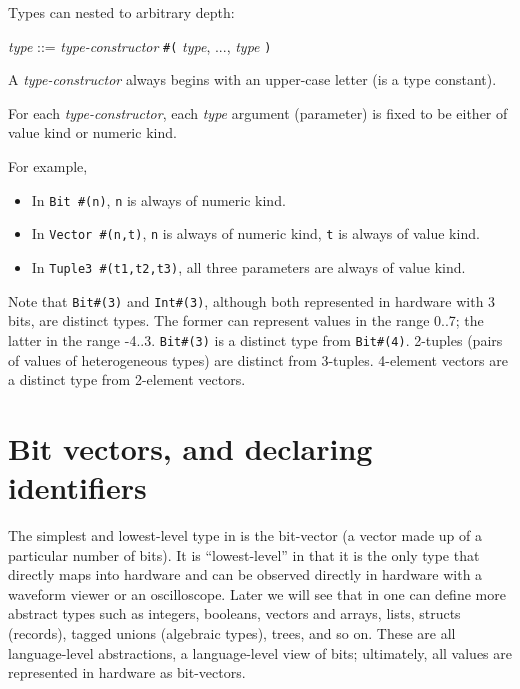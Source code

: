 Types can nested to arbitrary depth:

\begin{tabbing}
 \hmmmm \emph{type} ::= \emph{type-constructor} {\tt \#(} \emph{type}, ..., \emph{type} {\tt )}
\end{tabbing}

A \emph{type-constructor} always begins with an upper-case letter (is a type constant).

For each \emph{type-constructor}, each \emph{type} argument
(parameter) is fixed to be either of value kind or numeric kind.

For example,

\begin{itemize}

 \item In \verb|Bit #(n)|, \verb|n| is always of numeric kind.

 \item In \verb|Vector #(n,t)|, \verb|n| is always of numeric kind,
 \verb|t| is always of value kind.

 \item In \verb|Tuple3 #(t1,t2,t3)|, all three parameters are always of value kind.

\end{itemize}

Note that \verb|Bit#(3)| and \verb|Int#(3)|, although both represented
in hardware with 3 bits, are distinct types.  The former can represent
values in the range 0..7; the latter in the range -4..3.
\verb|Bit#(3)| is a distinct type from \verb|Bit#(4)|.  2-tuples
(pairs of values of heterogeneous types) are distinct from 3-tuples.
4-element vectors are a distinct type from 2-element vectors.


\section{Bit vectors, and declaring identifiers}

\label{Sec_BSV_Bit_Vectors}


The simplest and lowest-level type in {\BSV} is the bit-vector (a
vector made up of a particular number of bits).  It is
``lowest-level'' in that it is the only type that directly maps into
hardware and can be observed directly in hardware with a waveform
viewer or an oscilloscope.  Later we will see that in {\BSV} one can
define more abstract types such as integers, booleans, vectors and
arrays, lists, structs (records), tagged unions (algebraic types),
trees, and so on.  These are all language-level abstractions, {\ie} a
language-level view of bits; ultimately, all values are represented in
hardware as bit-vectors.

